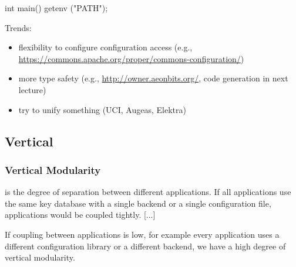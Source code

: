 
\begin{frame}[fragile]

	\begin{code}[language=Cpp,gobble=4,showspaces=no]
	int main()
	{
		getenv ("PATH");
	}
	\end{code}
\end{frame}

\begin{frame}[fragile]

	Trends:
	\begin{itemize}[<+-| alert@+>]
	\item flexibility to configure configuration access (e.g., \url{https://commons.apache.org/proper/commons-configuration/})
	\item more type safety (e.g., \url{http://owner.aeonbits.org/}, code generation in next lecture)
	\item try to unify something (UCI, Augeas, Elektra)
	\end{itemize}
\end{frame}

\begin{frame}
	\Large
\end{frame}

\subsection{Vertical}

\begin{frame}[fragile]
	\frametitle{Vertical Modularity \cite{raab2016improving}}

	 is the degree of separation between different applications.
	If all applications use the same key database with a single backend or a single configuration file, applications would be coupled tightly.
	[...]

	If coupling between applications is low, for example every application uses a different configuration library or a different backend, we have a high degree of vertical modularity.
\end{frame}


